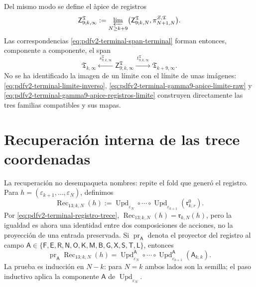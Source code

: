 Del mismo modo se define el \`apice de registros
\begin{equation}
\label{eq:pdfv2-terminal-gamma9-apice-registros-limite}
 \mathsf Z^{\mathfrak T}_{9;k,\infty}
 :=\varprojlim_{N\geq k+9}
 \bigl(\mathsf Z^{\mathfrak T}_{9;k,N},
       \pi^{Z,\mathfrak T}_{N+1,N}\bigr).
\end{equation}
Las correspondencias
\eqref{eq:pdfv2-terminal-span-terminal} forman entonces, componente a
componente, el span
\begin{equation}
\label{eq:pdfv2-terminal-span-limite}
 \mathfrak T_{k,\infty}
 \xleftarrow{\ s^{\mathfrak T}_{9;k,\infty}\ }
 \mathsf Z^{\mathfrak T}_{9;k,\infty}
 \xrightarrow{\ t^{\mathfrak T}_{9;k,\infty}\ }
 \mathfrak T_{k+9,\infty}.
\end{equation}
No se ha identificado la imagen de un l\'imite con el l\'imite de unas
im\'agenes: \eqref{eq:pdfv2-terminal-limite-inverso},
\eqref{eq:pdfv2-terminal-gamma9-apice-limite-raw} y
\eqref{eq:pdfv2-terminal-gamma9-apice-registros-limite} construyen
directamente las tres familias compatibles y sus mapas.

\section{Recuperaci\'on interna de las trece coordenadas}

La recuperaci\'on no desempaqueta nombres: repite el fold que gener\'o el
registro. Para
\(h=(\varepsilon_{k+1},\ldots,\varepsilon_N)\), definimos
\begin{equation}
\label{eq:pdfv2-terminal-recuperacion-trece}
 \boxed{
 \operatorname{Rec}_{13;k,N}(h):=
 \operatorname{Upd}_{\varepsilon_N}\circ\cdots\circ
 \operatorname{Upd}_{\varepsilon_{k+1}}
 (\mathfrak r^0_{k,r}).}
\end{equation}
Por \eqref{eq:pdfv2-terminal-registro-trece},
\(\operatorname{Rec}_{13;k,N}(h)=\mathfrak r_{k,N}(h)\), pero la igualdad
es ahora una identidad entre dos composiciones de acciones, no la
proyecci\'on de una entrada preservada. Si
\(\operatorname{pr}_{\mathsf A}\) denota el proyector del registro al campo
\(\mathsf A\in\{\mathsf F,\mathsf E,\mathsf R,\mathsf N,\mathsf O,
\mathsf K,\mathsf M,\mathsf B,\mathsf G,\mathsf X,\mathsf S,\mathsf T,
\mathsf L\}\), entonces
\begin{equation}
\label{eq:pdfv2-terminal-recuperacion-campo-fold}
 \operatorname{pr}_{\mathsf A}\operatorname{Rec}_{13;k,N}(h)
 =\operatorname{Upd}^{\mathsf A}_{\varepsilon_N}\circ\cdots\circ
  \operatorname{Upd}^{\mathsf A}_{\varepsilon_{k+1}}
  (\mathsf A_{k,k}).
\end{equation}
La prueba es inducci\'on en \(N-k\): para \(N=k\) ambos lados son la
semilla; el paso inductivo aplica la componente \(\mathsf A\) de
\(\operatorname{Upd}_{\varepsilon_N}\).

